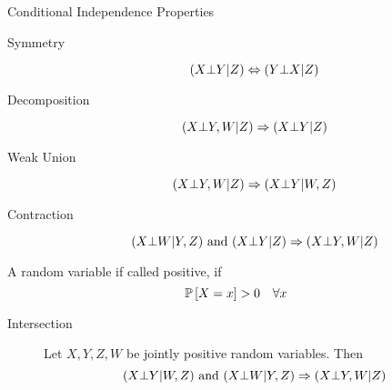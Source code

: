 \begin{frame}{Conditional Independence Properties}
    \label{appendix:conditional-independence-properties}
\begin{description}
    \item[Symmetry] 
    \begin{equation}
        (X \bot Y | Z) \Leftrightarrow (Y \bot X | Z)
    \end{equation}
    \item[Decomposition] 
    \begin{equation}
        \label{eq:decomposition-property}
        (X \bot Y,W | Z) \Rightarrow (X \bot Y | Z)
    \end{equation}
    \item[Weak Union]
    \begin{equation}
        (X \bot Y,W | Z) \Rightarrow (X \bot Y | W, Z)
    \end{equation}
    \item[Contraction]
    \begin{equation}
        (X \bot W | Y, Z) \text{ and } (X \bot Y | Z)  \Rightarrow (X \bot Y, W | Z)
    \end{equation}
\end{description}
\begin{definition}
    A random variable if called positive, if 
    \begin{equation}
        \Pb[X = x] > 0 \quad \forall x 
    \end{equation}
\end{definition}
\begin{description}
    \item[Intersection] Let $X,Y,Z,W$ be jointly positive random variables. Then
    \begin{equation}
        \label{eq:intersection-property}
       (X \bot Y | W,Z) \text{ and } (X \bot W | Y,Z) \Rightarrow (X \bot Y,W | Z) 
    \end{equation}
\end{description}
\end{frame}

